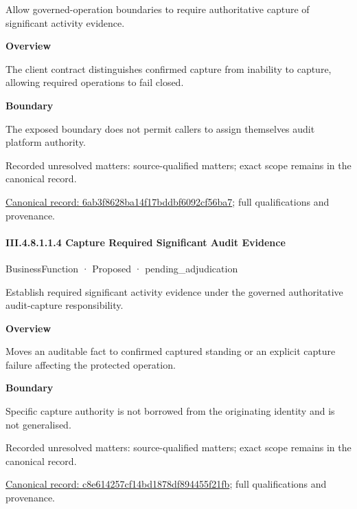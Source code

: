 Allow governed-operation boundaries to require authoritative capture of significant activity evidence.



\textbf{Overview}



The client contract distinguishes confirmed capture from inability to capture, allowing required operations to fail closed.



\textbf{Boundary}



The exposed boundary does not permit callers to assign themselves audit platform authority.


{\small Recorded unresolved matters: source-qualified matters; exact scope remains in the canonical record.}\par
{\footnotesize \href{../../../../../../../../continuum/business/business-service/6ab3f8628ba14f17bddbf6092cf56ba7.md}{Canonical record: 6ab3f8628ba14f17bddbf6092cf56ba7}; full qualifications and provenance.}\par
\paragraph*{III.4.8.1.1.4 Capture Required Significant Audit Evidence}
\label{navigation:III.4.8.1.1.4}

\label{element:c8e614257cf14bd1878df894455f21fb}
{\small BusinessFunction · Proposed · pending\_adjudication}\par

Establish required significant activity evidence under the governed authoritative audit-capture responsibility.



\textbf{Overview}



Moves an auditable fact to confirmed captured standing or an explicit capture failure affecting the protected operation.



\textbf{Boundary}



Specific capture authority is not borrowed from the originating identity and is not generalised.


{\small Recorded unresolved matters: source-qualified matters; exact scope remains in the canonical record.}\par
{\footnotesize \href{../../../../../../../../continuum/business/business-function/c8e614257cf14bd1878df894455f21fb.md}{Canonical record: c8e614257cf14bd1878df894455f21fb}; full qualifications and provenance.}\par
